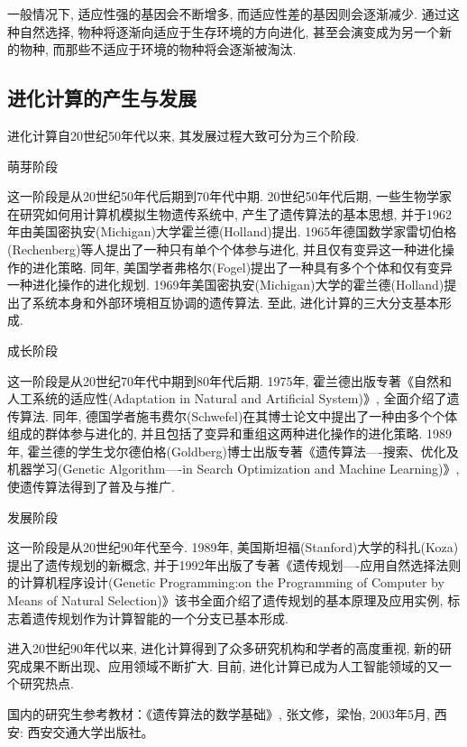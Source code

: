 \begin{remark}
    一般情况下, 适应性强的基因会不断增多, 而适应性差的基因则会逐渐减少.
    通过这种自然选择, 物种将逐渐向适应于生存环境的方向进化, 甚至会演变成为另一个新的物种, 而那些不适应于环境的物种将会逐渐被淘汰.
\end{remark}
\subsection{进化计算的产生与发展}
 进化计算自20世纪50年代以来, 其发展过程大致可分为三个阶段.

       萌芽阶段

     这一阶段是从20世纪50年代后期到70年代中期. 20世纪50年代后期, 一些生物学家在研究如何用计算机模拟生物遗传系统中, 产生了遗传算法的基本思想, 并于1962年由美国密执安(Michigan)大学霍兰德(Holland)提出.
     1965年德国数学家雷切伯格(Rechenberg)等人提出了一种只有单个个体参与进化, 并且仅有变异这一种进化操作的进化策略.
     同年, 美国学者弗格尔(Fogel)提出了一种具有多个个体和仅有变异一种进化操作的进化规划.
     1969年美国密执安(Michigan)大学的霍兰德(Holland)提出了系统本身和外部环境相互协调的遗传算法. 至此, 进化计算的三大分支基本形成.

      成长阶段

     这一阶段是从20世纪70年代中期到80年代后期. 1975年, 霍兰德出版专著《自然和人工系统的适应性(Adaptation in Natural and Artificial System)》, 全面介绍了遗传算法.
     同年, 德国学者施韦费尔(Schwefel)在其博士论文中提出了一种由多个个体组成的群体参与进化的, 并且包括了变异和重组这两种进化操作的进化策略.
     1989年, 霍兰德的学生戈尔德伯格(Goldberg)博士出版专著《遗传算法----搜索、优化及机器学习(Genetic Algorithm----in Search Optimization and Machine Learning)》, 使遗传算法得到了普及与推广.

     发展阶段

     这一阶段是从20世纪90年代至今. 1989年, 美国斯坦福(Stanford)大学的科扎(Koza)提出了遗传规划的新概念, 并于1992年出版了专著《遗传规划----应用自然选择法则的计算机程序设计(Genetic Programming:on the Programming of Computer by Means of Natural Selection)》该书全面介绍了遗传规划的基本原理及应用实例, 标志着遗传规划作为计算智能的一个分支已基本形成.

    进入20世纪90年代以来, 进化计算得到了众多研究机构和学者的高度重视, 新的研究成果不断出现、应用领域不断扩大.
    目前, 进化计算已成为人工智能领域的又一个研究热点.

    国内的研究生参考教材：《遗传算法的数学基础》,  张文修，梁怡, 2003年5月, 西安: 西安交通大学出版社。

